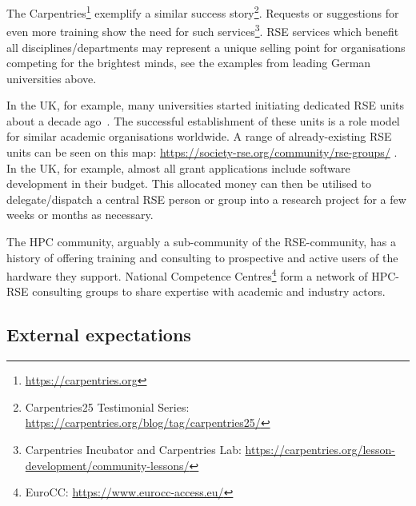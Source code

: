 \documentclass[a4paper]{article}
\begin{document}
 The Carpentries\footnote{\url{https://carpentries.org}}\autocite{Wilson2006} exemplify a similar success story\footnote{Carpentries25 Testimonial Series: \url{https://carpentries.org/blog/tag/carpentries25/}}.
 Requests or suggestions for even more training show the need for such services\footnote{Carpentries Incubator and Carpentries Lab: \url{https://carpentries.org/lesson-development/community-lessons/}}.
RSE services which benefit all disciplines/departments may represent a unique selling point for organisations competing for the brightest minds, see the examples from leading German universities above.


In the UK, for example, many universities started initiating dedicated RSE units about a decade ago~\autocite{Crouch2013}.
The successful establishment of these units is a role model for similar academic organisations worldwide.
A range of already-existing RSE units can be seen on this map: \url{https://society-rse.org/community/rse-groups/} .
In the UK, for example, almost all grant applications include software development in their budget.
This allocated money can then be utilised to delegate/dispatch a central RSE person or group into a research project for a few weeks or months as necessary.

The HPC community,
arguably a sub-community of the RSE-community,
has a history of offering training and consulting to prospective and active users of the hardware they support.
National Competence Centres\footnote{EuroCC: \url{https://www.eurocc-access.eu/}} form a network of HPC-RSE consulting groups to share expertise with academic and industry actors\autocite{eurocc_success_stories_2023,eurocc_success_stories_2024}.

\subsection{External expectations}
\end{document}
